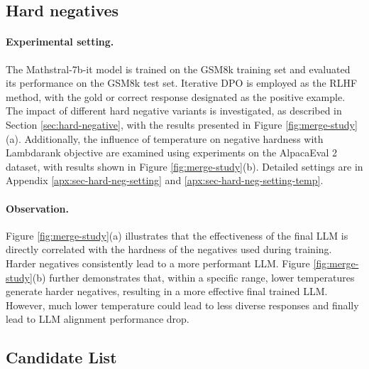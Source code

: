 

\subsection{Hard negatives}

\paragraph{Experimental setting.}
The Mathstral-7b-it model is trained on the GSM8k training set and evaluated its performance on the GSM8k test set. 
Iterative DPO is employed as the RLHF method, with the gold or correct response designated as the positive example. 
The impact of different hard negative variants is investigated, as described in Section \ref{sec:hard-negative}, with the results presented in Figure \ref{fig:merge-study}(a). 
Additionally, the influence of temperature on negative hardness with Lambdarank objective are examined using experiments on the AlpacaEval 2 dataset, with results shown in Figure \ref{fig:merge-study}(b).
Detailed settings are in Appendix \ref{apx:sec-hard-neg-setting} and \ref{apx:sec-hard-neg-setting-temp}.

% 

\paragraph{Observation.}
Figure \ref{fig:merge-study}(a) illustrates that the effectiveness of the final LLM is directly correlated with the hardness of the negatives used during training. 
Harder negatives consistently lead to a more performant LLM.  
Figure \ref{fig:merge-study}(b) further demonstrates that, within a specific range, lower temperatures generate harder negatives, resulting in a more effective final trained LLM. 
However, much lower temperature could lead to less diverse responses and finally lead to LLM alignment performance drop.


\subsection{Candidate List}

